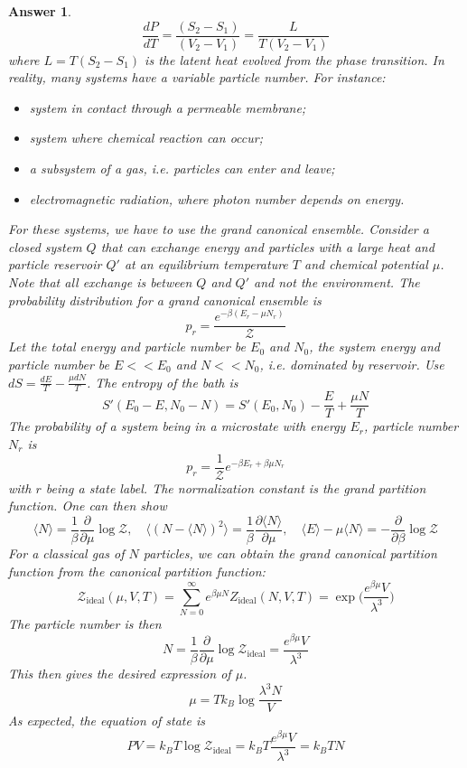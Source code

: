 \documentclass[a4paper]{article}
\theoremstyle{new2}
\newtheorem{ans}{Answer}[section]
\theoremstyle{new}
\begin{document}
\begin{ans}
$$\frac{dP}{dT}=\frac{(S_2-S_1)}{(V_2-V_1)}=\frac{L}{T(V_2-V_1)}$$
where $L=T(S_2-S_1)$ is the latent heat evolved from the phase transition. In reality, many systems have a variable particle number. For instance:
\begin{itemize}
    \item system in contact through a permeable membrane;
    \item system where chemical reaction can occur;
    \item a subsystem of a gas, i.e. particles can enter and leave;
    \item electromagnetic radiation, where photon number depends on energy.
\end{itemize}
For these systems, we have to use the grand canonical ensemble. Consider a closed system $Q$ that can exchange energy and particles with a large heat and particle reservoir $Q'$ at an equilibrium temperature $T$ and chemical potential $\mu$. Note that all exchange is between $Q$ and $Q'$ and not the environment. The probability distribution for a grand canonical ensemble is
$$p_r=\frac{e^{-\beta(E_r-\mu N_r)}}{\mathcal{Z}}$$
Let the total energy and particle number be $E_0$ and $N_0$, the system energy and particle number be $E<<E_0$ and $N<<N_0$, i.e. dominated by reservoir. Use $dS=\frac{dE}{T}-\frac{\mu dN}{T}$. The entropy of the bath is 
$$S'(E_0-E,N_0-N)=S'(E_0,N_0)-\frac{E}{T}+\frac{\mu N}{T}$$
The probability of a system being in a microstate with energy $E_r$, particle number $N_r$ is
$$p_r=\frac{1}{\mathcal{Z}}e^{-\beta E_r+\beta\mu N_r}$$
with $r$ being a state label. The normalization constant is the grand partition function. One can then show
$$\langle N\rangle=\frac{1}{\beta}\frac{\partial}{\partial\mu}\log\mathcal{Z},\quad\langle (N-\langle N\rangle)^2\rangle=\frac{1}{\beta}\frac{\partial\langle N\rangle}{\partial\mu},\quad\langle E\rangle-\mu\langle N\rangle=-\frac{\partial}{\partial\beta}\log\mathcal{Z}$$
For a classical gas of $N$ particles, we can obtain the grand canonical partition function from the canonical partition function:
$$\mathcal{Z}_{\text{ideal}}(\mu,V,T)=\sum_{N=0}^\infty e^{\beta\mu N}Z_{\text{ideal}}(N,V,T)=\exp\bigg(\frac{e^{\beta\mu }V}{\lambda^3}\bigg)$$
The particle number is then
$$N=\frac{1}{\beta}\frac{\partial}{\partial\mu}\log\mathcal{Z}_{\text{ideal}}=\frac{e^{\beta\mu }V}{\lambda^3}$$
This then gives the desired expression of $\mu$. 
$$\mu=Tk_B\log\frac{\lambda^3N}{V}$$
As expected, the equation of state is
$$PV=k_BT\log\mathcal{Z}_{\text{ideal}}=k_BT\frac{e^{\beta\mu}V}{\lambda^3}=k_BTN$$

\end{ans}
\end{document}
